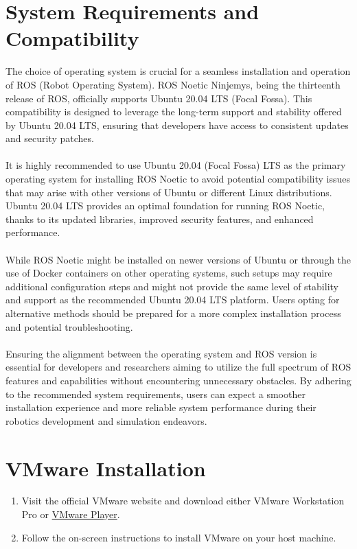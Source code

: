 \documentclass[12pt,a4paper]{article}
\begin{document}
	\section{System Requirements and Compatibility}
	The choice of operating system is crucial for a seamless installation and operation of ROS (Robot Operating System). ROS Noetic Ninjemys, being the thirteenth release of ROS, officially supports Ubuntu 20.04 LTS (Focal Fossa). This compatibility is designed to leverage the long-term support and stability offered by Ubuntu 20.04 LTS, ensuring that developers have access to consistent updates and security patches. 
	\\\\
	It is highly recommended to use Ubuntu 20.04 (Focal Fossa) LTS as the primary operating system for installing ROS Noetic to avoid potential compatibility issues that may arise with other versions of Ubuntu or different Linux distributions. Ubuntu 20.04 LTS provides an optimal foundation for running ROS Noetic, thanks to its updated libraries, improved security features, and enhanced performance. 
	\\\\
	While ROS Noetic might be installed on newer versions of Ubuntu or through the use of Docker containers on other operating systems, such setups may require additional configuration steps and might not provide the same level of stability and support as the recommended Ubuntu 20.04 LTS platform. Users opting for alternative methods should be prepared for a more complex installation process and potential troubleshooting.
	\\\\
	Ensuring the alignment between the operating system and ROS version is essential for developers and researchers aiming to utilize the full spectrum of ROS features and capabilities without encountering unnecessary obstacles. By adhering to the recommended system requirements, users can expect a smoother installation experience and more reliable system performance during their robotics development and simulation endeavors.
	
	\section{VMware Installation}
	\begin{enumerate}
		\item Visit the official VMware website and download either VMware Workstation Pro or \href{https://www.vmware.com/products/workstation-player.html}{VMware Player}.
		\item Follow the on-screen instructions to install VMware on your host machine.
	\end{enumerate}
	
\end{document}
